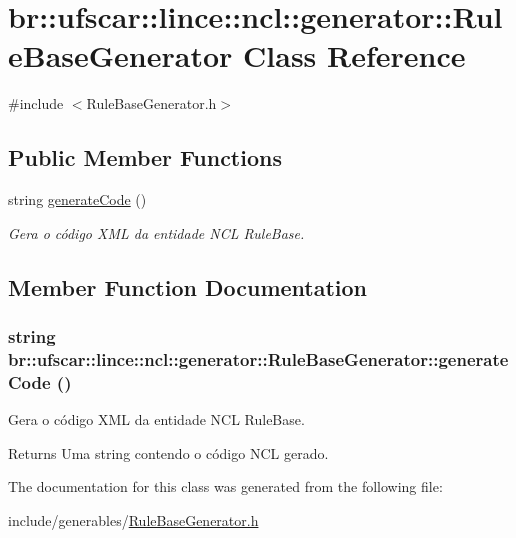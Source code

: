 \hypertarget{classbr_1_1ufscar_1_1lince_1_1ncl_1_1generator_1_1RuleBaseGenerator}{
\section{br::ufscar::lince::ncl::generator::RuleBaseGenerator Class Reference}
\label{classbr_1_1ufscar_1_1lince_1_1ncl_1_1generator_1_1RuleBaseGenerator}
}


{\ttfamily \#include $<$RuleBaseGenerator.h$>$}

\subsection*{Public Member Functions}
\begin{DoxyCompactItemize}
\item 
string \hyperlink{classbr_1_1ufscar_1_1lince_1_1ncl_1_1generator_1_1RuleBaseGenerator_a494fd813f8c2bec7665e6f5b8831621d}{generateCode} ()
\begin{DoxyCompactList}\small\item\em Gera o código XML da entidade NCL RuleBase. \item\end{DoxyCompactList}\end{DoxyCompactItemize}


\subsection{Member Function Documentation}
\hypertarget{classbr_1_1ufscar_1_1lince_1_1ncl_1_1generator_1_1RuleBaseGenerator_a494fd813f8c2bec7665e6f5b8831621d}{
\subsubsection[{generateCode}]{\setlength{\rightskip}{0pt plus 5cm}string br::ufscar::lince::ncl::generator::RuleBaseGenerator::generateCode ()}}
\label{classbr_1_1ufscar_1_1lince_1_1ncl_1_1generator_1_1RuleBaseGenerator_a494fd813f8c2bec7665e6f5b8831621d}


Gera o código XML da entidade NCL RuleBase. 

\begin{DoxyReturn}{Returns}
Uma string contendo o código NCL gerado. 
\end{DoxyReturn}


The documentation for this class was generated from the following file:\begin{DoxyCompactItemize}
\item 
include/generables/\hyperlink{RuleBaseGenerator_8h}{RuleBaseGenerator.h}\end{DoxyCompactItemize}
